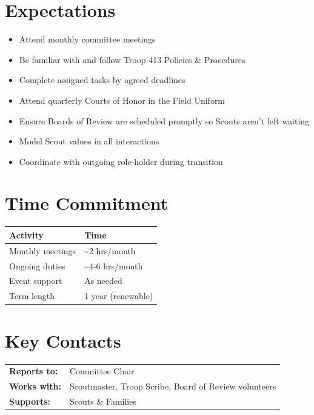 \documentclass[11pt, letterpaper]{article}
\begin{document}
\hfill
\begin{minipage}[t]{0.48\linewidth}
\raggedright

\section{Expectations}
\begin{itemize}
  \item Attend monthly committee meetings
  \item Be familiar with and follow Troop 413 Policies \& Procedures
  \item Complete assigned tasks by agreed deadlines
  \item Attend quarterly Courts of Honor in the Field Uniform
  \item Ensure Boards of Review are scheduled promptly so Scouts aren't left waiting
  \item Model Scout values in all interactions
  \item Coordinate with outgoing role-holder during transition
\end{itemize}

\section{Time Commitment}
\begin{tabular}{@{}p{3.0cm} p{3.8cm}@{}}
  \toprule
  \textbf{Activity} & \textbf{Time} \\
  \midrule
  Monthly meetings  & \textasciitilde{}2 hrs/month \\
  Ongoing duties    & \textasciitilde{}4-6 hrs/month \\
  Event support     & As needed \\
  Term length       & 1 year (renewable) \\
  \bottomrule
\end{tabular}

\vspace{1em}

\section{Key Contacts}
\begin{tabular}{@{}p{2.6cm} >{\raggedright\arraybackslash}p{4.2cm}@{}}
  \textbf{Reports to:}  & Committee Chair \\
  \textbf{Works with:}  & Scoutmaster, Troop Scribe, Board of Review volunteers \\
  \textbf{Supports:}    & Scouts \& Families \\
\end{tabular}

\end{minipage}
\end{document}
